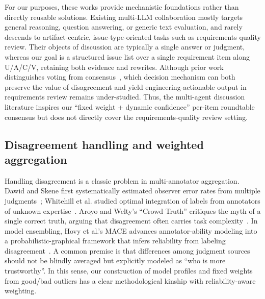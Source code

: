 \documentclass[sn-mathphys-num]{sn-jnl}
\begin{document}
For our purposes, these works provide mechanistic foundations rather than directly reusable solutions. Existing multi-LLM collaboration mostly targets general reasoning, question answering, or generic text evaluation, and rarely descends to artifact-centric, issue-type-oriented tasks such as requirements quality review. Their objects of discussion are typically a single answer or judgment, whereas our goal is a structured issue list over a single requirement item along U/A/C/V, retaining both evidence and rewrites. Although prior work distinguishes voting from consensus~\cite{ref19}, which decision mechanism can both preserve the value of disagreement and yield engineering-actionable output in requirements review remains under-studied. Thus, the multi-agent discussion literature inspires our ``fixed weight + dynamic confidence'' per-item roundtable consensus but does not directly cover the requirements-quality review setting.

\subsection{Disagreement handling and weighted aggregation}
Handling disagreement is a classic problem in multi-annotator aggregation. Dawid and Skene first systematically estimated observer error rates from multiple judgments~\cite{ref21}; Whitehill et al. studied optimal integration of labels from annotators of unknown expertise~\cite{ref22}. Aroyo and Welty's ``Crowd Truth'' critiques the myth of a single correct truth, arguing that disagreement often carries task complexity~\cite{ref23}. In model ensembling, Hovy et al.'s MACE advances annotator-ability modeling into a probabilistic-graphical framework that infers reliability from labeling disagreement~\cite{ref24}. A common premise is that differences among judgment sources should not be blindly averaged but explicitly modeled as ``who is more trustworthy''. In this sense, our construction of model profiles and fixed weights from good/bad outliers has a clear methodological kinship with reliability-aware weighting.
\end{document}
